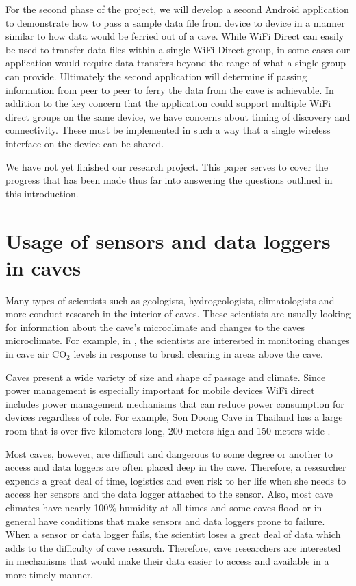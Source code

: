 \documentclass[10pt,twocolumn]{article}
\begin{document}
For the second phase of the project, we will develop a second Android application to demonstrate how to pass a sample data file from device to device in a manner similar to how data would be ferried out of a cave.
While WiFi Direct can easily be used to transfer data files within a single WiFi Direct group, in some cases our application would require data transfers beyond the range of what a single group can provide.
Ultimately the second application will determine if passing information from peer to peer to ferry the data from the cave is achievable. 
In addition to the key concern that the application could support multiple WiFi direct groups on the same device, we have concerns about timing of discovery and connectivity.
These must be implemented in such a way that a single wireless interface on the device can be shared.

We have not yet finished our research project. 
This paper serves to cover the progress that has been made thus far into answering the questions outlined in this introduction. 

\section{Usage of sensors and data loggers in caves}

Many types of scientists such as geologists, hydrogeologists, climatologists and more conduct research in the interior of caves. 
These scientists are usually looking for information about the cave's microclimate and changes to the caves microclimate. 
For example, in \cite{wong2010}, the scientists are interested in monitoring changes in cave air CO$_2$ levels in response to brush clearing in areas above the cave. 

Caves present a wide variety of size and shape of passage and climate. 
Since power management is especially important for mobile devices WiFi direct includes power management mechanisms that can reduce power consumption for devices regardless of role.
For example, Son Doong Cave in Thailand has a large room that is over five kilometers long, 200 meters high and 150 meters wide \cite{sondoong}.

Most caves, however, are difficult and dangerous to some degree or another to access and data loggers are often placed deep in the cave.
Therefore, a researcher expends a great deal of time, logistics and even risk to her life when she needs to access her sensors and the data logger attached to the sensor.
Also, most cave climates have nearly 100\% humidity at all times and some caves flood or in general have conditions that make sensors and data loggers prone to failure.
When a sensor or data logger fails, the scientist loses a great deal of data which adds to the difficulty of cave research.
Therefore, cave researchers are interested in mechanisms that would make their data easier to access and available in a more timely manner.
\end{document}
